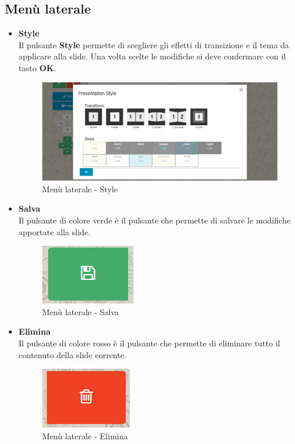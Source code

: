 \subsection{Menù laterale}
\begin{itemize}
 \item \textbf{Style}\\
    Il pulsante \textbf{Style} permette di scegliere gli effetti di transizione e il tema da applicare alla \gls{slide}. Una volta scelte le modifiche si deve confermare con il tasto \textbf{OK}.	
    \begin{figure}[H] 
    	\centering 
    	\includegraphics[scale=0.40] {img/editor_style.png}
    	\caption{Menù laterale - Style} 
    \end{figure}
	
 \item \textbf{Salva}\\
	Il pulsante di colore verde è il pulsante che permette di salvare le modifiche apportate alla \gls{slide}. 	
	\begin{figure}[H] 
		\centering 
		\includegraphics[scale=0.40] {img/editor_save.png}
		\caption{Menù laterale - Salva} 
	\end{figure}
	
	 \item \textbf{Elimina}\\
	 Il pulsante di colore rosso è il pulsante che permette di eliminare tutto il contenuto della \gls{slide} corrente.  	
	 \begin{figure}[H] 
	 	\centering 
	 	\includegraphics[scale=0.40] {img/editor_del.png}
	 	\caption{Menù laterale - Elimina} 
	 \end{figure}
	

\end{itemize}
